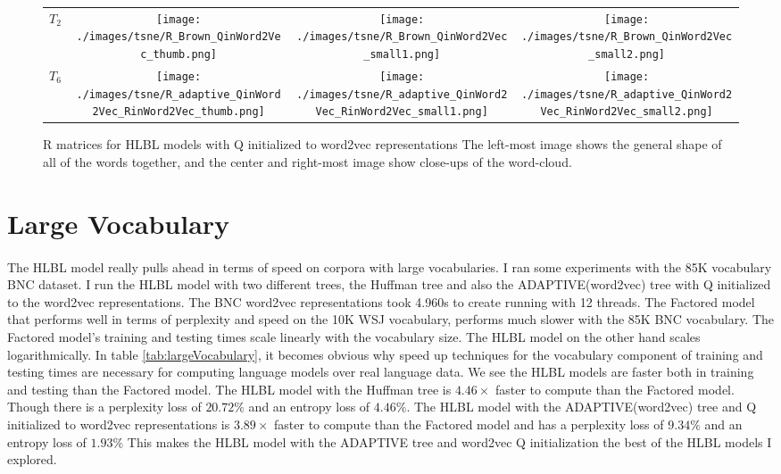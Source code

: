 \begin{figure}[p]
\centering
\begin{tabular}{@{}C{2cm}ccc@{}}
$T_2$ &
\texttt{[image: ./images/tsne/R\_Brown\_QinWord2Vec\_thumb.png]} &
\texttt{[image: ./images/tsne/R\_Brown\_QinWord2Vec\_small1.png]} &
\texttt{[image: ./images/tsne/R\_Brown\_QinWord2Vec\_small2.png]}
\\
$T_6$ &
\texttt{[image: ./images/tsne/R\_adaptive\_QinWord2Vec\_RinWord2Vec\_thumb.png]} &
\texttt{[image: ./images/tsne/R\_adaptive\_QinWord2Vec\_RinWord2Vec\_small1.png]} &
\texttt{[image: ./images/tsne/R\_adaptive\_QinWord2Vec\_RinWord2Vec\_small2.png]}
\end{tabular}
\caption{R matrices for HLBL models with Q initialized to word2vec representations The left-most image shows the general shape of all of the words together, and the center and right-most image show close-ups of the word-cloud.}
\label{fig:RcloudWord2Vec}
\end{figure}


\section{Large Vocabulary}
\paragraph{}
The HLBL model really pulls ahead in terms of speed on corpora with large vocabularies. I ran some experiments with the 85K vocabulary BNC dataset.  I run the HLBL model with two different trees, the Huffman tree and also the ADAPTIVE(word2vec) tree with Q initialized to the word2vec representations. The BNC word2vec representations took 4.960s to create running with 12 threads. 
The Factored model that performs well in terms of perplexity and speed on the 10K WSJ vocabulary, performs much slower with the 85K BNC vocabulary. The Factored model's training and testing times scale linearly with the vocabulary size. The HLBL model on the other hand scales logarithmically. In table \ref{tab:largeVocabulary}, it becomes obvious why speed up techniques for the vocabulary component of training and testing times are necessary for computing language models over real language data. We see the HLBL models are faster both in training and testing than the Factored model. The HLBL model with the Huffman tree is $4.46\times$ faster to compute than the Factored model. Though there is a perplexity loss of $20.72\%$ and an entropy loss of $4.46\%$. The HLBL model with the ADAPTIVE(word2vec) tree and Q initialized to word2vec representations is $3.89\times$ faster to compute than the Factored model and has a perplexity loss of $9.34\%$ and an entropy loss of $1.93\%$ This makes the HLBL model with the ADAPTIVE tree and word2vec Q initialization the best of the HLBL models I explored.

